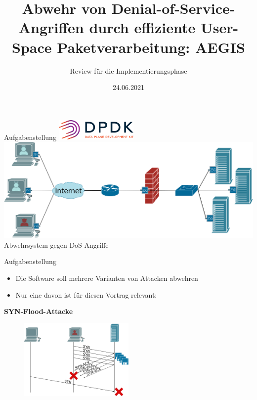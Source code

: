 \documentclass{beamer}
\title[Abwehr von Denial-of-Service-Angriffen durch effiziente User-Space Paketverarbeitung: AEGIS]{Abwehr von Denial-of-Service-Angriffen durch effiziente User-Space Paketverarbeitung: AEGIS}
\subtitle{Review für die Implementierungsphase}
\institute{Technische Universität Ilmenau}
\date{24.06.2021}
\begin{document}
\begin{frame}
    \maketitle %
\end{frame}

\begin{frame}{Aufgabenstellung}
    \center
    \includegraphics[width=0.3\textwidth]{dpdk_logo.png}
    \includegraphics[width=\textwidth]{Netzwerkplan-Real.png}
    \center
    Abwehrsystem gegen DoS-Angriffe
\end{frame}

\begin{frame}{Aufgabenstellung}
    \begin{itemize}
        \item Die Software soll mehrere Varianten von Attacken abwehren
        \item Nur eine davon ist für diesen Vortrag relevant:
    \end{itemize}
    \center
    \textbf{SYN-Flood-Attacke}
    \begin{figure}[h!]
        \includegraphics[width=0.5\textwidth]{SYN-FLOOD.png}
    \end{figure}
\end{frame}
\end{document}
